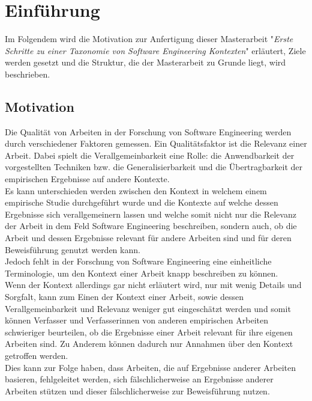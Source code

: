 \chapter{Einführung}
\label{chapter:intro}
Im Folgendem wird die Motivation zur Anfertigung dieser Masterarbeit
"\textit{Erste Schritte zu einer Taxonomie von Software Engineering Kontexten}" erläutert,
Ziele werden gesetzt und die Struktur, die der Masterarbeit zu Grunde liegt, wird beschrieben.

\section{Motivation}
Die Qualität von Arbeiten in der Forschung von Software Engineering werden durch verschiedener Faktoren gemessen.
Ein Qualitätsfaktor ist die Relevanz einer Arbeit.
Dabei spielt die Verallgemeinbarkeit eine Rolle: die Anwendbarkeit der vorgestellten Techniken bzw. die Generalisierbarkeit und die Übertragbarkeit der empirischen Ergebnisse auf andere Kontexte. \\

Es kann unterschieden werden zwischen den Kontext in welchem einem empirische Studie durchgeführt wurde und die Kontexte auf welche dessen Ergebnisse sich verallgemeinern lassen und welche somit nicht nur die Relevanz der Arbeit in dem Feld Software Engineering beschreiben, sondern auch, ob die Arbeit und dessen Ergebnisse relevant für andere Arbeiten sind und für deren Beweisführung genutzt werden kann. \\

Jedoch fehlt in der Forschung von Software Engineering eine einheitliche Terminologie, um den Kontext einer Arbeit knapp beschreiben zu können. \\
Wenn der Kontext allerdings gar nicht erläutert wird, nur mit wenig Details und Sorgfalt, kann zum Einen der Kontext einer Arbeit, sowie dessen Verallgemeinbarkeit und Relevanz weniger gut eingeschätzt werden und somit können Verfasser und Verfasserinnen von anderen empirischen Arbeiten schwieriger beurteilen, ob die Ergebnisse einer Arbeit relevant für ihre eigenen Arbeiten sind. Zu Anderem können dadurch nur Annahmen über den Kontext getroffen werden. \\
Dies kann zur Folge haben, dass Arbeiten, die auf Ergebnisse anderer Arbeiten basieren, fehlgeleitet werden, sich fälschlicherweise an Ergebnisse anderer Arbeiten stützen und dieser fälschlicherweise zur Beweisführung nutzen. \\ 

